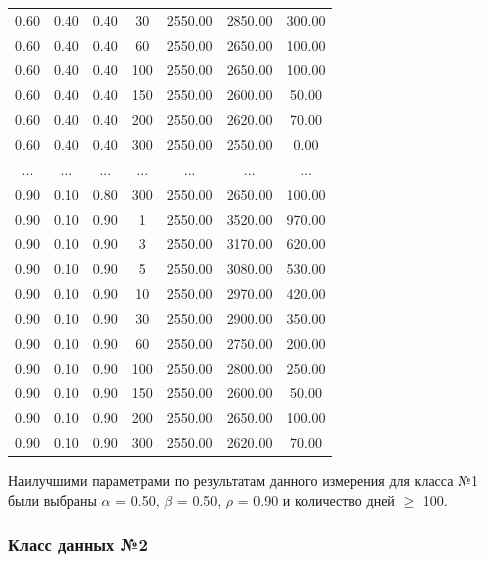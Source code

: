 \begin{table}[H]
\begin{tabular}{|c|c|c|c|c|c|c|}
  0.60 &   0.40 &   0.40 &     30 &    2550.00 &    2850.00 &     300.00  \\
  0.60 &   0.40 &   0.40 &     60 &    2550.00 &    2650.00 &     100.00  \\
  0.60 &   0.40 &   0.40 &    100 &    2550.00 &    2650.00 &     100.00  \\
  0.60 &   0.40 &   0.40 &    150 &    2550.00 &    2600.00 &      50.00  \\
  0.60 &   0.40 &   0.40 &    200 &    2550.00 &    2620.00 &      70.00  \\
  0.60 &   0.40 &   0.40 &    300 &    2550.00 &    2550.00 &       0.00  \\
    ... &   ... &   ... &    ... &    ... &    ... &      ...  \\
      0.90 &   0.10 &   0.80 &    300 &    2550.00 &    2650.00 &     100.00  \\
  0.90 &   0.10 &   0.90 &      1 &    2550.00 &    3520.00 &     970.00  \\
  0.90 &   0.10 &   0.90 &      3 &    2550.00 &    3170.00 &     620.00  \\
  0.90 &   0.10 &   0.90 &      5 &    2550.00 &    3080.00 &     530.00  \\
  0.90 &   0.10 &   0.90 &     10 &    2550.00 &    2970.00 &     420.00  \\
  0.90 &   0.10 &   0.90 &     30 &    2550.00 &    2900.00 &     350.00  \\
  0.90 &   0.10 &   0.90 &     60 &    2550.00 &    2750.00 &     200.00  \\
  0.90 &   0.10 &   0.90 &    100 &    2550.00 &    2800.00 &     250.00  \\
  0.90 &   0.10 &   0.90 &    150 &    2550.00 &    2600.00 &      50.00  \\
  0.90 &   0.10 &   0.90 &    200 &    2550.00 &    2650.00 &     100.00  \\
  0.90 &   0.10 &   0.90 &    300 &    2550.00 &    2620.00 &      70.00  \\
  \hline
    \end{tabular}
\end{table}

Наилучшими параметрами по результатам данного измерения для класса №1 были выбраны   $\alpha$ = 0.50, $\beta$ = 0.50, $\rho$ = 0.90 и количество дней $\geq$ 100.

\subsubsection{Класс данных №2}

